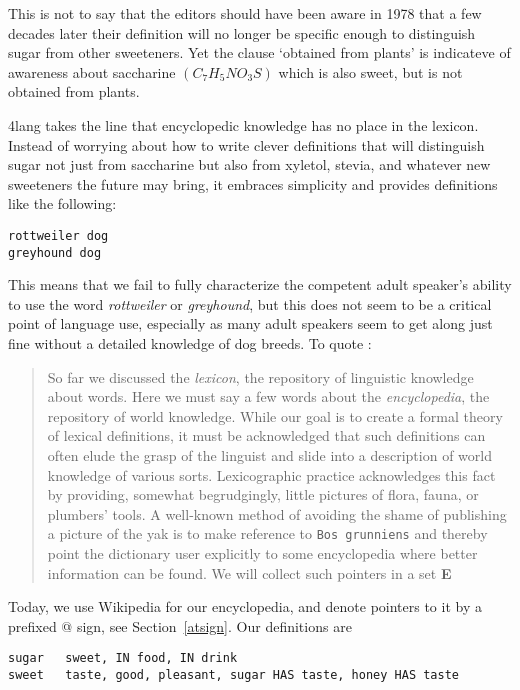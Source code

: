 \documentclass[11pt,bookmarks,bookmarksnumbered,naturalnames,plainpages=false,pdftex,colorlinks=true,urlcolor=blue,bookmarksdepth=subsection,plainpages=false]{paper}
\begin{document}
This is not to say that the editors should have been aware in 1978 that a few
decades later their definition will no longer be specific enough to
distinguish sugar from other sweeteners. Yet the clause `obtained from
plants' is indicateve of awareness about saccharine $(C_7H_5NO_3S)$ which is
also sweet, but is not obtained from plants.  

4lang takes the line that encyclopedic knowledge has no place in the
lexicon. Instead of worrying about how to write clever definitions that will
distinguish sugar not just from saccharine but also from xyletol, stevia, and
whatever new sweeteners the future may bring, it embraces simplicity and
provides definitions like the following:

\begin{verbatim} 
rottweiler dog
greyhound dog
\end{verbatim}

\noindent
This means that we fail to fully characterize the competent adult speaker's
ability to use the word {\it rottweiler} or {\it greyhound}, but this does not
seem to be a critical point of language use, especially as many adult speakers
seem to get along just fine without a detailed knowledge of dog breeds. To
quote \cite{Kornai:2010}:

\begin{quote}
So far we discussed the {\it lexicon}, the repository of linguistic knowledge
about words. Here we must say a few words about the {\it encyclopedia}, the
repository of world knowledge. While our goal is to create a formal theory of
lexical definitions, it must be acknowledged that such definitions can often
elude the grasp of the linguist and slide into a description of world
knowledge of various sorts.  Lexicographic practice acknowledges this fact by
providing, somewhat begrudgingly, little pictures of flora, fauna, or
plumbers' tools. A well-known method of avoiding the shame of publishing a
picture of the yak is to make reference to {\tt Bos grunniens} and thereby
point the dictionary user explicitly to some encyclopedia where better
information can be found. We will collect such pointers in a set {\bf E}
\end{quote}

\noindent
Today, we use Wikipedia for our encyclopedia, and denote pointers to it by a
prefixed @ sign, see Section~\ref{atsign}. Our definitions are 

\begin{verbatim} 
sugar	sweet, IN food, IN drink
sweet	taste, good, pleasant, sugar HAS taste, honey HAS taste
\end{verbatim}
\end{document}
